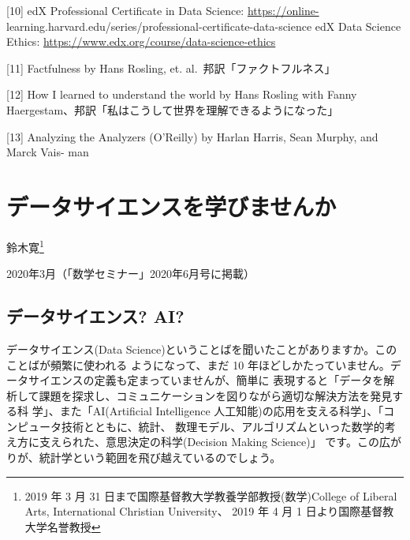 \documentclass[
]{book}
\theoremstyle{definition}
\theoremstyle{definition}
\theoremstyle{definition}
\theoremstyle{definition}
\theoremstyle{remark}
\begin{document}
{[}10{]} edX Professional Certificate in Data Science: \url{https://online-} learning.harvard.edu/series/professional-certificate-data-science edX Data Science Ethics: \url{https://www.edx.org/course/data-science-ethics}

{[}11{]} Factfulness by Hans Rosling, et. al.~邦訳「ファクトフルネス」

{[}12{]} How I learned to understand the world by Hans Rosling with Fanny Haergestam、邦訳「私はこうして世界を理解できるようになった」

{[}13{]} Analyzing the Analyzers (O'Reilly) by Harlan Harris, Sean Murphy, and Marck Vais- man

\hypertarget{susemi202006}{%
\chapter{データサイエンスを学びませんか}\label{susemi202006}}

鈴木寛\footnote{2019 年 3 月 31 日まで国際基督教大学教養学部教授(数学)College of Liberal Arts, International Christian University、 2019 年 4 月 1 日より国際基督教大学名誉教授}

2020年3月（「数学セミナー」2020年6月号に掲載）

\hypertarget{ux30c7ux30fcux30bfux30b5ux30a4ux30a8ux30f3ux30b9-ai}{%
\section{データサイエンス? AI?}\label{ux30c7ux30fcux30bfux30b5ux30a4ux30a8ux30f3ux30b9-ai}}

データサイエンス(Data Science)ということばを聞いたことがありますか。このことばが頻繁に使われる ようになって、まだ 10 年ほどしかたっていません。データサイエンスの定義も定まっていませんが、簡単に 表現すると「データを解析して課題を探求し、コミュニケーションを図りながら適切な解決方法を発見する科 学」、また「AI(Artificial Intelligence 人工知能)の応用を支える科学」、「コンピュータ技術とともに、統計、 数理モデル、アルゴリズムといった数学的考え方に支えられた、意思決定の科学(Decision Making Science)」 です。この広がりが、統計学という範囲を飛び越えているのでしょう。
\end{document}
